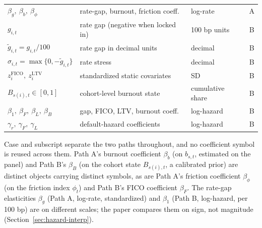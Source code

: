 \documentclass[12pt]{article}
\begin{document}
\begin{table}[H]
\begin{threeparttable}
\begin{tabular}{@{}lllc@{}}
$\beta_g,\ \beta_b,\ \beta_\phi$ & rate-gap, burnout, friction coeff. & log-rate & A \\
$g_{i,t}$ & rate gap (negative when locked in) & 100 bp units & B \\
$\tilde g_{i,t}=g_{i,t}/100$ & rate gap in decimal units & decimal & B \\
$\sigma_{i,t}=\max\{0,-\tilde g_{i,t}\}$ & rate stress & decimal & B \\
$z^{\mathrm{FICO}}_{i},\ z^{\mathrm{LTV}}_{i}$ & standardized static covariates & SD & B \\
$B_{s(i),t}\in[0,1]$ & cohort-level burnout state & cumulative share & B \\
$\beta_1,\ \beta_F,\ \beta_L,\ \beta_B$ & gap, FICO, LTV, burnout coeff. & log-hazard & B \\
$\gamma_r,\ \gamma_F,\ \gamma_L$ & default-hazard coefficients & log-hazard & B \\
\bottomrule
\end{tabular}
\begin{tablenotes}[flushleft]\scriptsize
\item Case and subscript separate the two paths throughout, and no coefficient symbol is reused across them. Path A's burnout coefficient $\beta_b$ (on $b_{s,t}$, estimated on the panel) and Path B's $\beta_B$ (on the cohort state $B_{s(i),t}$, a calibrated prior) are distinct objects carrying distinct symbols, as are Path A's friction coefficient $\beta_\phi$ (on the friction index $\phi_t$) and Path B's FICO coefficient $\beta_F$. The rate-gap elasticities $\beta_g$ (Path A, log-rate, standardized) and $\beta_1$ (Path B, log-hazard, per 100 bp) are on different scales; the paper compares them on sign, not magnitude (Section~\ref{sec:hazard-interp}).
\end{tablenotes}
\end{threeparttable}
\end{table}
\end{document}
